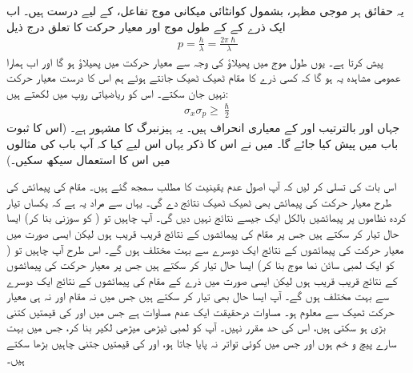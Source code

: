  یہ حقائق ہر موجی مظہر، بشمول کوانٹائی میکانی موج تفاعل، کے لیے درست ہیں۔ اب ایک ذرے کے  کے طول موج اور معیار حرکت کا تعلق درج ذیل  
\begin{align}\label{مساوات_تفاعل_موج_ڈی_بروگلی_معیار_حرکت}
p=\frac{h}{\lambda}=\frac{2\pi\hslash}{\lambda}
\end{align}
پیش کرتا ہے۔ یوں طول موج میں پھیلاؤ کی وجہ سے  معیار حرکت میں  پھیلاؤ ہو گا اور اب ہمارا عمومی مشاہدہ یہ ہو گا کہ کسی ذرے کا مقام ٹھیک ٹھیک جانتے ہوئے ہم اس کا  درست معیار حرکت نہیں جان سکتے۔ اس کو ریاضیاتی روپ میں لکھتے ہیں:
\begin{align}\label{مساوات_تفاعل_موج_اصول_عدم_یقینیت}
\sigma_{x}\sigma_{p}\ge\frac{\hslash}{2}
\end{align}
جہاں  اور  بالترتیب  اور  کے معیاری انحراف ہیں۔ یہ ہیزنبرگ کا مشہور  ہے۔ (اس کا ثبوت باب  میں پیش کیا جائے گا۔ میں نے اس کا ذکر یہاں اس لیے کیا کہ آپ باب  کی مثالوں میں اس کا استعمال سیکھ سکیں۔)

 اس بات کی تسلی کر لیں کہ آپ اصول عدم یقینیت کا مطلب سمجھ گئے ہیں۔ مقام کی پیمائش کی طرح معیار حرکت کی پیمائش بھی ٹھیک ٹھیک نتائج دے گی۔ یہاں  سے مراد یہ ہے کہ یکساں تیار کردہ نظاموں پر پیمائشیں بالکل ایک جیسے نتائج نہیں دیں گی۔ آپ چاہیں تو ( کو سوزنی بنا کر) ایسا حال تیار کر سکتے ہیں جس پر مقام کی پیمائشوں  کے  نتائج  قریب قریب ہوں  لیکن ایسی صورت میں معیار حرکت کی پیمائشوں کے نتائج ایک دوسرے سے بہت مختلف ہوں گے۔ اس طرح آپ چاہیں تو ( کو ایک لمبی سائن نما موج بنا کر) ایسا حال تیار کر سکتے ہیں جس پر معیار حرکت کی پیمائشوں کے نتائج   قریب  قریب ہوں  لیکن ایسی صورت میں ذرے کے مقام کی پیمائشوں کے نتائج ایک دوسرے سے بہت مختلف ہوں گے۔ آپ ایسا حال بھی تیار کر سکتے ہیں جس میں نہ مقام اور  نہ ہی  معیار حرکت ٹھیک سے معلوم ہو۔ مساوات   درحقیقت ایک عدم مساوات ہے جس میں  اور  کی قیمتیں  کتنی بڑی ہو سکتی ہیں، اس کی حد مقرر نہیں۔ آپ  کو لمبی ٹیڑھی میڑھی لکیر بنا کر، جس میں بہت سارے پیچ و خم ہوں اور جس میں کوئی تواتر نہ پایا جاتا ہو،  اور  کی قیمتیں جتنی چاہیں بڑھا سکتے ہیں۔

